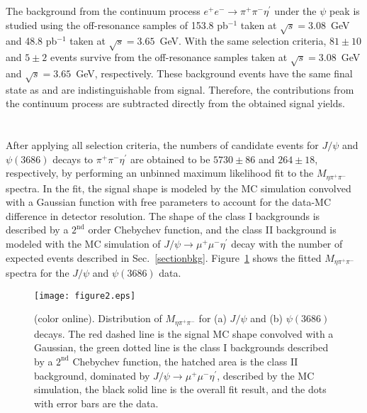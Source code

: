 \documentclass[twocolumn,showpacs,aps,prd]{revtex4-1}
\newcommand{\etap}{\eta^{\prime}}
\newcommand{\psip}{\psi(3686)}
\newcommand{\jpsidimu}{J/\psi\rightarrow\mu^{+} \mu^{-}\etap}
\begin{document}
The background from the continuum process $e^{+}e^{-} \to \pi^{+} \pi^{-}\etap$ under the $\psi$ peak is studied using the off-resonance samples of 153.8 pb$^{-1}$ taken at $\sqrt{s} = 3.08$~GeV and 48.8 pb$^{-1}$ taken at $\sqrt{s} = 3.65$~GeV. With the same selection criteria, $81\pm10$ and $5\pm2$
  events survive from the off-resonance samples taken at $\sqrt{s} = 3.08$~GeV and $\sqrt{s} = 3.65$~GeV, respectively. These background events have the same final state as and are indistinguishable from signal. Therefore, the contributions from the continuum process are subtracted directly from the obtained signal yields.






\section{ }\label{sectionfit}

After applying all selection criteria, the numbers of candidate events for $J/\psi$ and $\psip$ decays to $\pi^{+} \pi^{-} \etap$ are obtained to be $5730\pm86$ and
$264\pm18$, respectively, by performing an unbinned maximum likelihood fit to the $M_{\eta\pi^+\pi^-}$ spectra. In the fit, the signal shape is modeled by the MC simulation convolved with
a Gaussian function with free parameters to account for the data-MC difference in detector resolution. The shape of the class I backgrounds
is described by a $2^\text{nd}$ order Chebychev function, and the class II background is modeled with the MC simulation of $\jpsidimu$ decay with the number of expected events described in Sec.~\ref{sectionbkg}. Figure~\ref{etapmass} shows the fitted $M_{\eta\pi^+\pi^-}$ spectra for the $J/\psi$ and $\psip$ data.

\begin{figure}[tb]
\centering
    \texttt{[image: figure2.eps]}
  \caption{(color online). Distribution of $M_{\eta\pi^+\pi^-}$ for (a) $J/\psi$ and (b) $\psi(3686)$ decays. The red dashed line is the signal
  MC shape convolved with a Gaussian, the green dotted line is the class I backgrounds described by a $2^\text{nd}$ Chebychev function, the hatched
  area is the class II background, dominated by $J/\psi \to \mu^{+} \mu^{-} \eta^{\prime}$, described by the MC simulation, the black solid line is the overall fit result, and the
  dots with error bars are the data.}
\label{etapmass}
\end{figure}
%
\end{document}
